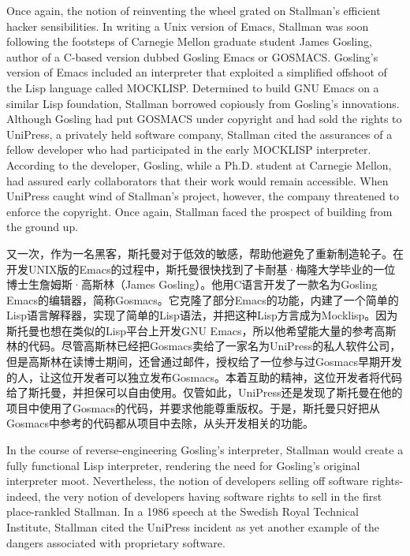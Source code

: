 \ifdefined\vone
\ifdefined\eng
Once again, the notion of reinventing the wheel grated on Stallman's efficient hacker sensibilities. In writing a Unix version of Emacs, Stallman was soon following the footsteps of Carnegie Mellon graduate student James Gosling, author of a C-based version dubbed Gosling Emacs or GOSMACS. Gosling's version of Emacs included an interpreter that exploited a simplified offshoot of the Lisp language called MOCKLISP. Determined to build GNU Emacs on a similar Lisp foundation, Stallman borrowed copiously from Gosling's innovations. Although Gosling had put GOSMACS under copyright and had sold the rights to UniPress, a privately held software company, Stallman cited the assurances of a fellow developer who had participated in the early MOCKLISP interpreter. According to the developer, Gosling, while a Ph.D. student at Carnegie Mellon, had assured early collaborators that their work would remain accessible. When UniPress caught wind of Stallman's project, however, the company threatened to enforce the copyright. Once again, Stallman faced the prospect of building from the ground up.
\fi

\ifdefined\chs
又一次，作为一名黑客，斯托曼对于低效的敏感，帮助他避免了重新制造轮子。在开发UNIX版的Emacs的过程中，斯托曼很快找到了卡耐基·梅隆大学毕业的一位博士生詹姆斯·高斯林（James Gosling）。他用C语言开发了一款名为Gosling Emacs的编辑器，简称Gosmacs。它克隆了部分Emacs的功能，内建了一个简单的Lisp语言解释器，实现了简单的Lisp语法，并把这种Lisp方言成为Mocklisp。因为斯托曼也想在类似的Lisp平台上开发GNU Emacs，所以他希望能大量的参考高斯林的代码。尽管高斯林已经把Gosmacs卖给了一家名为UniPress的私人软件公司，但是高斯林在读博士期间，还曾通过邮件，授权给了一位参与过Gosmacs早期开发的人，让这位开发者可以独立发布Gosmacs。本着互助的精神，这位开发者将代码给了斯托曼，并担保可以自由使用。仅管如此，UniPress还是发现了斯托曼在他的项目中使用了Gosmacs的代码，并要求他能尊重版权。于是，斯托曼只好把从Gosmacs中参考的代码都从项目中去除，从头开发相关的功能。

\fi

\ifdefined\eng
In the course of reverse-engineering Gosling's interpreter, Stallman would create a fully functional Lisp interpreter, rendering the need for Gosling's original interpreter moot. Nevertheless, the notion of developers selling off software rights-indeed, the very notion of developers having software rights to sell in the first place-rankled Stallman. In a 1986 speech at the Swedish Royal Technical Institute, Stallman cited the UniPress incident as yet another example of the dangers associated with proprietary software.
\fi

